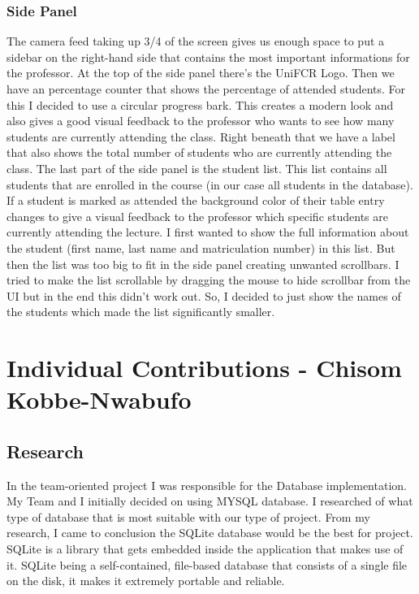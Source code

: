 \documentclass[12pt, a4paper]{article}
\begin{document}
\subsubsection{Side Panel}
The camera feed taking up 3/4 of the screen gives us enough space to put a sidebar on the right-hand side that contains the most important informations for the professor. At the top of the side panel there’s the UniFCR Logo. Then we have an percentage counter that shows the percentage of attended students. For this I decided to use a circular progress bark. This creates a modern look and also gives a good visual feedback to the professor who wants to see how many students are currently attending the class. Right beneath that we have a label that also shows the total number of students who are currently attending the class. The last part of the side panel is the student list. This list contains all students that are enrolled in the course (in our case all students in the database). If a student is marked as attended the background color of their table entry changes to give a visual feedback to the professor which specific students are currently attending the lecture. I first wanted to show the full information about the student (first name, last name and matriculation number) in this list. But then the list was too big to fit in the side panel creating unwanted scrollbars. I tried to make the list scrollable by dragging the mouse to hide scrollbar from the UI but in the end this didn’t work out. So, I decided to just show the names of the students which made the list significantly smaller. 


\newpage



\section{Individual Contributions - Chisom Kobbe-Nwabufo}
\subsection{Research}
In the team-oriented project I was responsible for the Database implementation. My Team and I initially decided on using MYSQL database. I researched of what type of database that is most suitable with our type of project. From my research, I came to conclusion the SQLite database would be the best for project.
SQLite is a library that gets embedded inside the application that makes use of it. SQLite being a self-contained, file-based database that consists of a single file on the disk, it makes it extremely portable and reliable.
\end{document}
